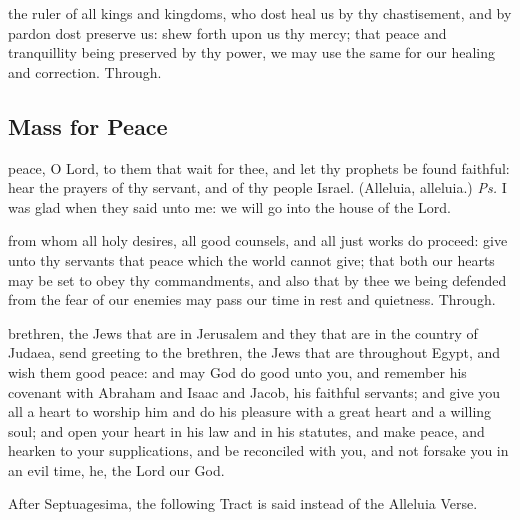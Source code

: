 
\postcommunion
{} the ruler of all kings and kingdoms, who dost heal us by thy chastisement, and by pardon dost preserve us: shew forth upon us thy mercy; that peace and tranquillity being preserved by thy power, we may use the same for our healing and correction. Through.


\subsection{Mass for Peace}

\introit
{} peace, O Lord, to them that wait for thee, and let thy prophets be found faithful: hear the prayers of thy servant, and of thy people Israel. (Alleluia, alleluia.) \textit{Ps.} I was glad when they said unto me: we will go into the house of the Lord.

\clearpage
\collect
{} from whom all holy desires, all good counsels, and all just works do proceed: give unto thy servants that peace which the world cannot give; that both our hearts may be set to obey thy commandments, and also that by thee we being defended from the fear of our enemies may pass our time in rest and quietness. Through.

 brethren, the Jews that are in Jerusalem and they that are in the country of Judaea, send greeting to the brethren, the Jews that are throughout Egypt, and wish them good peace: and may God do good unto you, and remember his covenant with Abraham and Isaac and Jacob, his faithful servants; and give you all a heart to worship him and do his pleasure with a great heart and a willing soul; and open your heart in his law and in his statutes, and make peace, and hearken to your supplications, and be reconciled with you, and not forsake you in an evil time, he, the Lord our God.


\begin{rubric}
    After Septuagesima, the following Tract is said instead of the Alleluia Verse.
\end{rubric}

